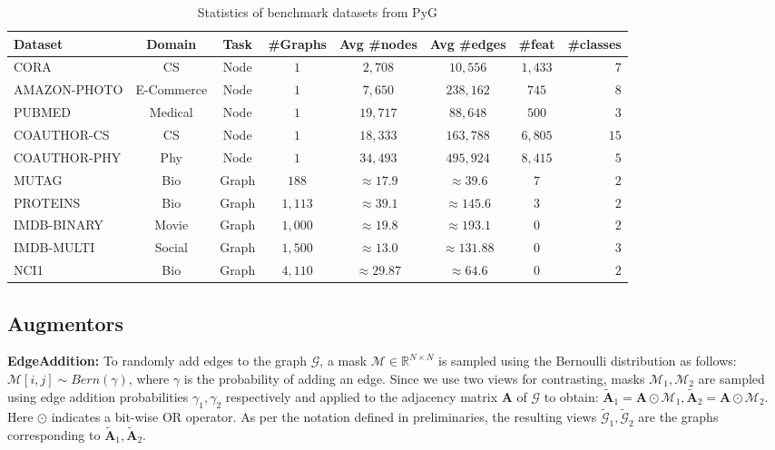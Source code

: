 \documentclass{article}
\def\mA{{\mathbf{A}}}
\def\gG{{\mathcal{G}}}
\theoremstyle{plain}
\theoremstyle{definition}
\theoremstyle{remark}
\begin{document}
\begin{table*}[ht!]
\centering
\caption{Statistics of benchmark datasets from PyG}
\label{table:datasets}
\vskip 0.15in
\begin{center}
\begin{small}
\begin{sc}
\begin{tabular}{lccccccr}
\toprule
Dataset & Domain & Task &  \#Graphs & Avg \#nodes & Avg \#edges & \#feat & \#classes \\
\midrule
CORA & CS & Node & $1$ & $2,708$ & $10,556$ & $1,433$ & $7$\\
AMAZON-PHOTO & E-Commerce & Node & $1$ & $7,650$ & $238,162$ & $745$ & $8$ \\
PUBMED &  Medical & Node & $1$ & $19,717$ & $88,648$ & $500$ & $3$ \\
COAUTHOR-CS & CS & Node & $1$ & $18,333$ & $163,788$ & $6,805$ & $15$ \\
COAUTHOR-PHY & Phy & Node & $1$ & $34,493$ & $495,924$ & $8,415$ & $5$ \\
\midrule
MUTAG & Bio & Graph & $188$ & $\approx 17.9$ & $\approx 39.6$ & $7$ & $2$ \\
PROTEINS & Bio & Graph & $1,113$ & $\approx 39.1$ & $\approx 145.6$ & $3$ & $2$ \\
IMDB-BINARY & Movie & Graph & $1,000$ & $\approx 19.8$ & $\approx 193.1$ & $0$ & $2$ \\
IMDB-MULTI & Social & Graph & $1,500$ & $\approx 13.0$ & $\approx 131.88$ & $0$ & $3$ \\
NCI1 & Bio & Graph & $4,110$ & $\approx 29.87$ & $\approx 64.6$ & $0$ & $2$ \\
\bottomrule
\end{tabular}
\end{sc}
\end{small}
\end{center}
\vskip -0.1in
\end{table*}

\subsection{Augmentors}

\textbf{EdgeAddition:} To randomly add edges to the graph $\gG$, a mask $\mathcal{M} \in \mathbb{R}^{N \times N}$ is sampled using the Bernoulli distribution as follows: $\mathcal{M}[i,j] \sim Bern(\gamma)$, where $\gamma$ is the probability of adding an edge. Since we use two views for contrasting, masks $\mathcal{M}_1, \mathcal{M}_2$ are sampled using edge addition probabilities $\gamma_1, \gamma_2$ respectively and applied to the adjacency matrix $\mA$ of $\gG$ to obtain: $\widetilde{\mA}_1 = \mA \odot \mathcal{M}_1, \widetilde{\mA}_2 = \mA \odot \mathcal{M}_2$. Here $\odot$ indicates a bit-wise OR operator.  As per the notation defined in preliminaries, the resulting views $\widetilde{\gG}_1, \widetilde{\gG}_2$ are the graphs corresponding to $\widetilde{\mA}_1, \widetilde{\mA}_2$.
\end{document}
